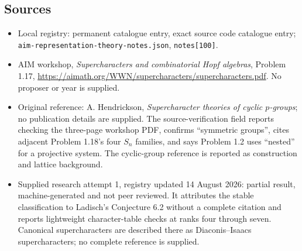 \documentclass[11pt]{article}
\begin{document}
\subsection{Sources}
\begin{itemize}
\item Local registry: permanent catalogue entry, exact source code catalogue entry; \texttt{aim-representation-theory-notes.json}, \texttt{notes[100]}.
\item AIM workshop, \emph{Supercharacters and combinatorial Hopf algebras}, Problem 1.17, \url{https://aimath.org/WWN/supercharacters/supercharacters.pdf}. No proposer or year is supplied.
\item Original reference: A. Hendrickson, \emph{Supercharacter theories of cyclic $p$-groups}; no publication details are supplied. The source-verification field reports checking the three-page workshop PDF, confirms ``symmetric groups'', cites adjacent Problem 1.18's four $S_n$ families, and says Problem 1.2 uses ``nested'' for a projective system. The cyclic-group reference is reported as construction and lattice background.
\item Supplied research attempt 1, registry updated 14 August 2026: partial result, machine-generated and not peer reviewed. It attributes the stable classification to Ladisch's Conjecture 6.2 without a complete citation and reports lightweight character-table checks at ranks four through seven. Canonical supercharacters are described there as Diaconis--Isaacs supercharacters; no complete reference is supplied.
\end{itemize}
\end{document}
